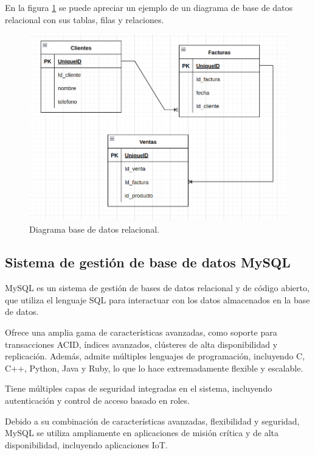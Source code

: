 En la figura \ref{fig:relddbb} se puede apreciar un ejemplo de un diagrama de base de datos relacional con sus tablas, filas y relaciones.

\begin{figure}[ht]
	\centering
	\includegraphics[scale=.50]{./Figures/relddbb.png}
	\caption{Diagrama base de datos relacional.}
	\label{fig:relddbb}
\end{figure}

\subsection{Sistema de gestión de base de datos MySQL}
\label{subsec:mysql}

MySQL \citep{WEBSITE:mysql-site} es un sistema de gestión de bases de datos relacional y de código abierto, que utiliza el lenguaje SQL para interactuar con los datos almacenados en la base de datos. 

Ofrece una amplia gama de características avanzadas, como soporte para transacciones ACID, índices avanzados, clústeres de alta disponibilidad y replicación. Además, admite múltiples lenguajes de programación, incluyendo C, C++, Python, Java y Ruby, lo que lo hace extremadamente flexible y escalable.

Tiene múltiples capas de seguridad integradas en el sistema, incluyendo autenticación y control de acceso basado en roles. 

Debido a su combinación de características avanzadas, flexibilidad y seguridad, MySQL se utiliza ampliamente en aplicaciones de misión crítica y de alta disponibilidad, incluyendo aplicaciones IoT.

